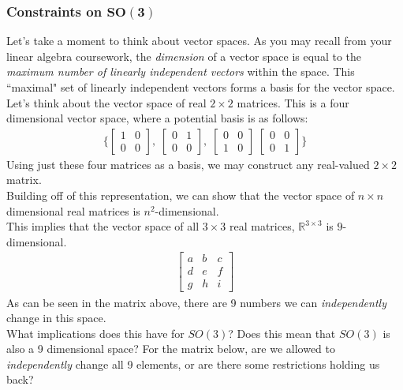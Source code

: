 \documentclass[oneside]{book}
\begin{document}
\subsubsection{Constraints on $\mathbf{SO(3)}$}
Let's take a moment to think about vector spaces. As you may recall from your linear algebra coursework, the \textit{dimension} of a vector space is equal to the \textit{maximum number of linearly independent vectors} within the space. This ``maximal" set of linearly independent vectors forms a basis for the vector space.\\
Let's think about the vector space of real $2\times 2$ matrices. This is a four dimensional vector space, where a potential basis is as follows:
\begin{align}
    \Bigg\{
    \begin{bmatrix}
    1 & 0\\
    0 & 0
    \end{bmatrix}, \;
    \begin{bmatrix}
    0 & 1\\
    0 & 0
    \end{bmatrix}, \;
    \begin{bmatrix}
    0 & 0\\
    1 & 0
    \end{bmatrix} \;
    \begin{bmatrix}
    0 & 0\\
    0 & 1
    \end{bmatrix}
    \Bigg\}
\end{align}
Using just these four matrices as a basis, we may construct any real-valued $2\times 2$ matrix.\\
Building off of this representation, we can show that the vector space of $n\times n$ dimensional real matrices is $n^2$-dimensional.\\
This implies that the vector space of all $3\times 3$ real matrices, $\mathbb{R}^{3\times 3}$ is $9$-dimensional.
\begin{align}
    \begin{bmatrix}
    a & b & c\\
    d & e & f\\
    g & h & i
    \end{bmatrix}
\end{align}
As can be seen in the matrix above, there are 9 numbers we can \textit{independently} change in this space.\\
What implications does this have for $SO(3)$? Does this mean that $SO(3)$ is also a 9 dimensional space? For the matrix below, are we allowed to \textit{independently} change all 9 elements, or are there some restrictions holding us back?
\end{document}
